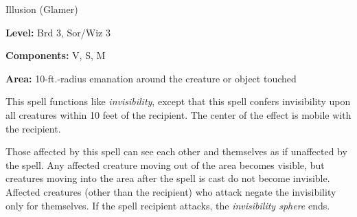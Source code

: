 
Illusion (Glamer)

\textbf{Level:} Brd 3, Sor/Wiz 3

\textbf{Components:} V, S, M

\textbf{Area:} 10-ft.-radius emanation around the creature or object touched

This spell functions like \textit{invisibility}, except that this spell confers 
invisibility upon all creatures within 10 feet of the recipient. The center of 
the effect is mobile with the recipient.

Those affected by this spell can see each other and themselves as if unaffected 
by the spell. Any affected creature moving out of the area becomes visible, but 
creatures moving into the area after the spell is cast do not become invisible. 
Affected creatures (other than the recipient) who attack negate the invisibility 
only for themselves. If the spell recipient attacks, the \textit{invisibility sphere 
}ends.

